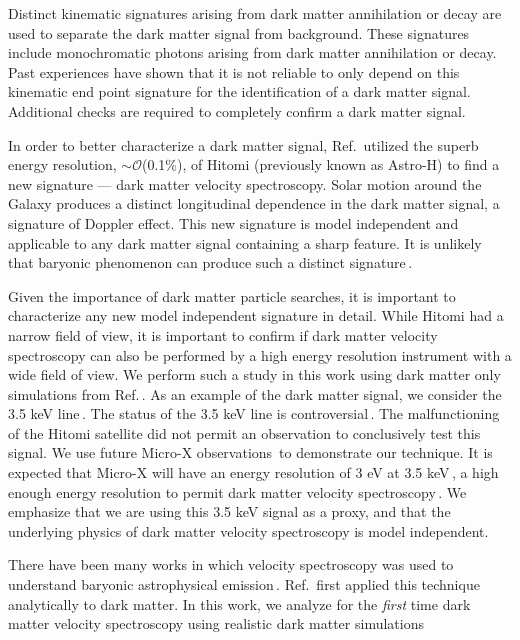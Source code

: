 \documentclass[aps,prd,10pt,twocolumn,superscriptaddress,showpacs]{revtex4-1}
\begin{document}
Distinct kinematic signatures arising from dark matter annihilation or decay are used to separate the dark matter signal from background.  These signatures include monochromatic photons arising from dark matter annihilation or decay.  Past experiences have shown that it is not reliable to only depend on this kinematic end point signature for the identification of a dark matter signal.  Additional checks are required to completely confirm a dark matter signal.  

In order to better characterize a dark matter signal, Ref.\,\cite{speckhard2016} utilized the superb energy resolution, $\sim \mathcal{O}$(0.1\%), of Hitomi (previously known as Astro-H) to find a new signature --- dark matter velocity spectroscopy.  Solar motion around the Galaxy produces a distinct longitudinal dependence in the dark matter signal, a signature of Doppler effect.  This new signature is model independent and applicable to any dark matter signal containing a sharp feature.  It is unlikely that baryonic phenomenon can produce such a distinct signature\,\cite{speckhard2016}.

Given the importance of dark matter particle searches, it is important to characterize any new model independent signature in detail.  While Hitomi had a narrow field of view, it is important to confirm if dark matter velocity spectroscopy can also be performed by a high energy resolution instrument with a wide field of view.  We perform such a study in this work using dark matter only simulations from Ref.\,\cite{mao2015}.  As an example of the dark matter signal, we consider the 3.5 keV line\,\cite{Bulbul:2014sua,Boyarsky:2014jta}.  The status of the 3.5 keV line is controversial\,\cite{Iakubovskyi:2015wma,Jeltema:2015mee,Ruchayskiy:2015onc,Bulbul:2016yop,Aharonian:2016gzq,Hofmann:2016urz,Arguelles:2016uwb,Conlon:2016lxl,Neronov:2016wdd,Perez:2016tcq}.  The malfunctioning of the Hitomi satellite did not permit an observation to conclusively test this signal.  We use future Micro-X observations\,\cite{Figueroa-Feliciano:2015gwa} to demonstrate our technique.  It is expected that Micro-X will have an energy resolution of 3 eV at 3.5 keV\,\cite{Figueroa-Feliciano:2015gwa}, a high enough energy resolution to permit dark matter velocity spectroscopy\,\cite{speckhard2016}.  We emphasize that we are using this 3.5 keV signal as a proxy, and that the underlying physics of dark matter velocity spectroscopy is model independent. 

There have been many works in which velocity spectroscopy was used to understand baryonic astrophysical emission\,\cite{Dame:2000sp,Diehl:2006cf,Kalberla:2008uu,Kretschmer:2013naa}.  Ref.\,\cite{speckhard2016} first applied this technique analytically to dark matter.  In this work, we analyze for the {\it first} time dark matter velocity spectroscopy using realistic dark matter simulations 
\end{document}
